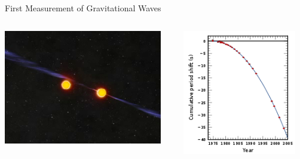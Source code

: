 \documentclass[aspectratio=169,xcolor=dvipsnames]{beamer}
\begin{document}
\begin{frame}{First Measurement of Gravitational Waves}
    \begin{columns}[t]
    \begin{column}{6cm}
    \includegraphics[height=5cm]{BinaryPulsar.png}
    \end{column}

    \begin{column}{5cm}
    \includegraphics[height=5.5cm]{htbp.png}
    
    \end{column}
  
    \end{columns}
\end{frame}
\end{document}
